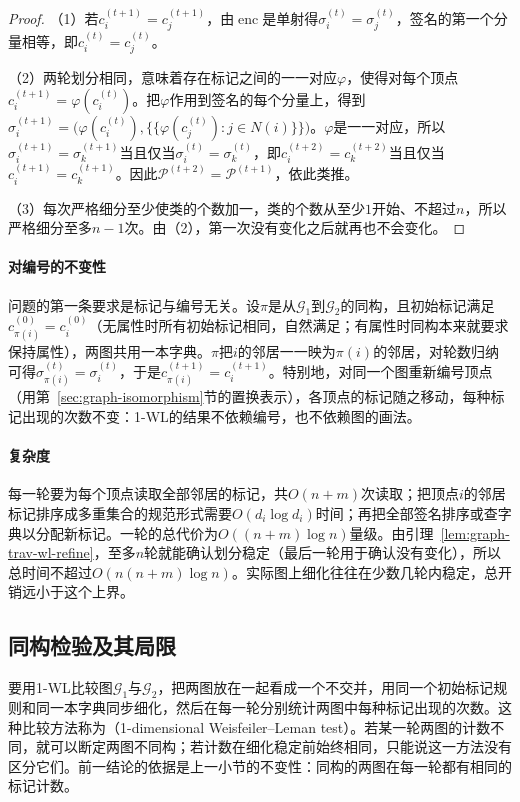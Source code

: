 \begin{proof}
（1）若$c_i^{(t+1)}=c_j^{(t+1)}$，由$\operatorname{enc}$是单射得$\sigma_i^{(t)}=\sigma_j^{(t)}$，签名的第一个分量相等，即$c_i^{(t)}=c_j^{(t)}$。

（2）两轮划分相同，意味着存在标记之间的一一对应$\varphi$，使得对每个顶点$c_i^{(t+1)}=\varphi(c_i^{(t)})$。把$\varphi$作用到签名的每个分量上，得到$\sigma_i^{(t+1)}=\bigl(\varphi(c_i^{(t)}),\{\!\{\varphi(c_j^{(t)}):j\in N(i)\}\!\}\bigr)$。$\varphi$是一一对应，所以$\sigma_i^{(t+1)}=\sigma_k^{(t+1)}$当且仅当$\sigma_i^{(t)}=\sigma_k^{(t)}$，即$c_i^{(t+2)}=c_k^{(t+2)}$当且仅当$c_i^{(t+1)}=c_k^{(t+1)}$。因此$\mathcal P^{(t+2)}=\mathcal P^{(t+1)}$，依此类推。

（3）每次严格细分至少使类的个数加一，类的个数从至少$1$开始、不超过$n$，所以严格细分至多$n-1$次。由（2），第一次没有变化之后就再也不会变化。
\end{proof}

\paragraph{对编号的不变性}
问题的第一条要求是标记与编号无关。设$\pi$是从$\mathcal G_1$到$\mathcal G_2$的同构，且初始标记满足$c_{\pi(i)}^{(0)}=c_i^{(0)}$（无属性时所有初始标记相同，自然满足；有属性时同构本来就要求保持属性），两图共用一本字典。$\pi$把$i$的邻居一一映为$\pi(i)$的邻居，对轮数归纳可得$\sigma_{\pi(i)}^{(t)}=\sigma_i^{(t)}$，于是$c_{\pi(i)}^{(t+1)}=c_i^{(t+1)}$。特别地，对同一个图重新编号顶点（用第~\ref{sec:graph-isomorphism}节的置换表示），各顶点的标记随之移动，每种标记出现的次数不变：1-WL的结果不依赖编号，也不依赖图的画法。

\paragraph{复杂度}
每一轮要为每个顶点读取全部邻居的标记，共$O(n+m)$次读取；把顶点$i$的邻居标记排序成多重集合的规范形式需要$O(d_i\log d_i)$时间；再把全部签名排序或查字典以分配新标记。一轮的总代价为$O((n+m)\log n)$量级。由引理~\ref{lem:graph-trav-wl-refine}，至多$n$轮就能确认划分稳定（最后一轮用于确认没有变化），所以总时间不超过$O(n(n+m)\log n)$。实际图上细化往往在少数几轮内稳定，总开销远小于这个上界。

\subsection{同构检验及其局限}
\label{sec:graph-trav-wl-power}

要用1-WL比较图$\mathcal G_1$与$\mathcal G_2$，把两图放在一起看成一个不交并，用同一个初始标记规则和同一本字典同步细化，然后在每一轮分别统计两图中每种标记出现的次数。这种比较方法称为（1-dimensional Weisfeiler--Leman test）。若某一轮两图的计数不同，就可以断定两图不同构；若计数在细化稳定前始终相同，只能说这一方法没有区分它们。前一结论的依据是上一小节的不变性：同构的两图在每一轮都有相同的标记计数。

